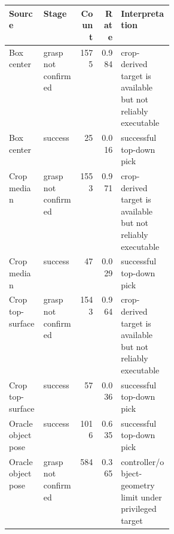 \begin{tabular}{llrrp{0.32\linewidth}}
\toprule
Source & Stage & Count & Rate & Interpretation \\
\midrule
Box center & grasp not confirmed & 1575 & 0.984 & crop-derived target is available but not reliably executable \\
Box center & success & 25 & 0.016 & successful top-down pick \\
Crop median & grasp not confirmed & 1553 & 0.971 & crop-derived target is available but not reliably executable \\
Crop median & success & 47 & 0.029 & successful top-down pick \\
Crop top-surface & grasp not confirmed & 1543 & 0.964 & crop-derived target is available but not reliably executable \\
Crop top-surface & success & 57 & 0.036 & successful top-down pick \\
Oracle object pose & success & 1016 & 0.635 & successful top-down pick \\
Oracle object pose & grasp not confirmed & 584 & 0.365 & controller/object-geometry limit under privileged target \\
\bottomrule
\end{tabular}
